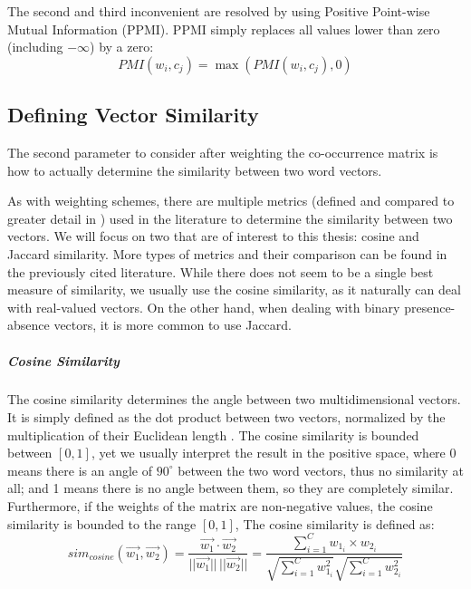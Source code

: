 The second and third inconvenient are resolved by using Positive Point-wise Mutual Information (PPMI). PPMI simply replaces all values lower than zero (including $-\infty$) by a zero:
\begin{equation} \label{eq:ppmi}
PMI(w_i,c_j) = \max(PMI(w_i,c_j), 0)
\end{equation}
\subsection{Defining Vector Similarity}
The second parameter to consider after weighting the co-occurrence matrix is how to actually determine the similarity between two word vectors.

As with weighting schemes, there are multiple metrics (defined and compared to greater detail in \cite{ClarkBook2010,ferret2010testing,kiela2014systematic,clark2015vector}) used in the literature to determine the similarity between two vectors. We will focus on two that are of interest to this thesis: cosine and Jaccard similarity. More types of metrics and their comparison can be found in the previously cited literature. While there does not seem to be a single best measure of similarity, we usually use the cosine similarity, as it naturally can deal with real-valued vectors. On the other hand, when dealing with binary presence-absence vectors, it is more common to use Jaccard. 

\subparagraph{Cosine Similarity}
The cosine similarity determines the angle between two multidimensional vectors. It is simply defined as the dot product between two vectors, normalized by the multiplication of their Euclidean length \cite{Manning2008}. The cosine similarity is bounded between $[0,1]$, yet we usually interpret the result in the positive space, where 0 means there is an angle of $90^\circ$ between the two word vectors, thus  no similarity at all; and 1 means there is no angle between them, so they are completely similar. Furthermore, if the weights of the matrix are non-negative values, the cosine similarity is bounded to the range $[0,1]$, The cosine similarity is defined as:
\begin{equation}
sim_{cosine}(\overrightarrow{w_1},\overrightarrow{w_2})  =  \dfrac{\overrightarrow{w_1}  \cdot \overrightarrow{w_2}}{||\overrightarrow{w_1}||\,||\overrightarrow{w_2}||} = \dfrac{\sum_{i=1}^Cw_{1_i}\times w_{2_i} }{\sqrt{\sum^C_{i=1}w_{1_i}^2}\sqrt{\sum^C_{i=1}w_{2_i}^2}}
\end{equation}

